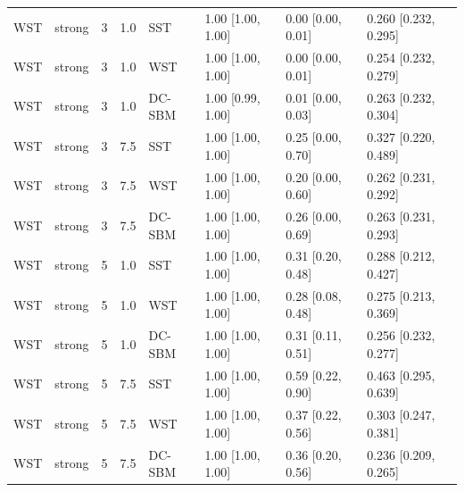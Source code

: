 \begin{table}
\begin{tabular}[t]{llrrllll}
WST & strong & 3 & 1.0 & SST & 1.00 [1.00, 1.00] & 0.00 [0.00, 0.01] & 0.260 [0.232, 0.295]\\
WST & strong & 3 & 1.0 & WST & 1.00 [1.00, 1.00] & 0.00 [0.00, 0.01] & 0.254 [0.232, 0.279]\\
WST & strong & 3 & 1.0 & DC-SBM & 1.00 [0.99, 1.00] & 0.01 [0.00, 0.03] & 0.263 [0.232, 0.304]\\
WST & strong & 3 & 7.5 & SST & 1.00 [1.00, 1.00] & 0.25 [0.00, 0.70] & 0.327 [0.220, 0.489]\\
\addlinespace
WST & strong & 3 & 7.5 & WST & 1.00 [1.00, 1.00] & 0.20 [0.00, 0.60] & 0.262 [0.231, 0.292]\\
WST & strong & 3 & 7.5 & DC-SBM & 1.00 [1.00, 1.00] & 0.26 [0.00, 0.69] & 0.263 [0.231, 0.293]\\
WST & strong & 5 & 1.0 & SST & 1.00 [1.00, 1.00] & 0.31 [0.20, 0.48] & 0.288 [0.212, 0.427]\\
WST & strong & 5 & 1.0 & WST & 1.00 [1.00, 1.00] & 0.28 [0.08, 0.48] & 0.275 [0.213, 0.369]\\
WST & strong & 5 & 1.0 & DC-SBM & 1.00 [1.00, 1.00] & 0.31 [0.11, 0.51] & 0.256 [0.232, 0.277]\\
\addlinespace
WST & strong & 5 & 7.5 & SST & 1.00 [1.00, 1.00] & 0.59 [0.22, 0.90] & 0.463 [0.295, 0.639]\\
WST & strong & 5 & 7.5 & WST & 1.00 [1.00, 1.00] & 0.37 [0.22, 0.56] & 0.303 [0.247, 0.381]\\
WST & strong & 5 & 7.5 & DC-SBM & 1.00 [1.00, 1.00] & 0.36 [0.20, 0.56] & 0.236 [0.209, 0.265]\\
\bottomrule
\end{tabular}
\end{table}
